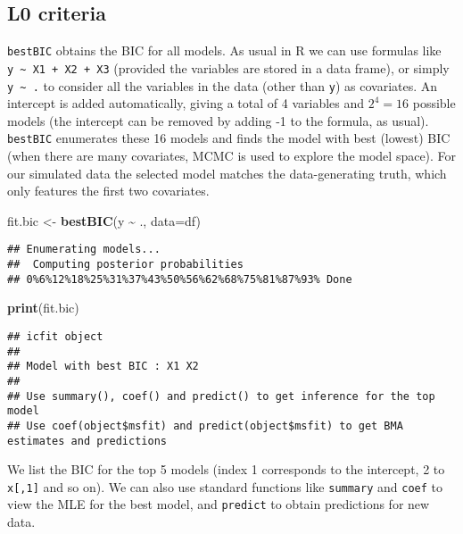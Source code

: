 \documentclass[
]{book}
\newenvironment{Shaded}{\begin{snugshade}}{\end{snugshade}}
\newcommand{\AttributeTok}[1]{\textcolor[rgb]{0.13,0.29,0.53}{#1}}
\newcommand{\FunctionTok}[1]{\textcolor[rgb]{0.13,0.29,0.53}{\textbf{#1}}}
\newcommand{\NormalTok}[1]{#1}
\newcommand{\OtherTok}[1]{\textcolor[rgb]{0.56,0.35,0.01}{#1}}
\newcommand{\SpecialCharTok}[1]{\textcolor[rgb]{0.81,0.36,0.00}{\textbf{#1}}}
\theoremstyle{definition}
\theoremstyle{definition}
\theoremstyle{definition}
\theoremstyle{definition}
\theoremstyle{remark}
\begin{document}
\subsection{L0 criteria}\label{l0-criteria}

\texttt{bestBIC} obtains the BIC for all models.
As usual in R we can use formulas like \texttt{y\ \textasciitilde{}\ X1\ +\ X2\ +\ X3} (provided the variables are stored in a data frame), or simply \texttt{y\ \textasciitilde{}\ .} to consider all the variables in the data (other than \texttt{y}) as covariates.
An intercept is added automatically, giving a total of 4 variables and \(2^4=16\) possible models (the intercept can be removed by adding -1 to the formula, as usual). \texttt{bestBIC} enumerates these 16 models and finds the model with best (lowest) BIC (when there are many covariates, MCMC is used to explore the model space).
For our simulated data the selected model matches the data-generating truth, which only features the first two covariates.

\begin{Shaded}
\begin{Highlighting}[]
\NormalTok{fit.bic }\OtherTok{\textless{}{-}} \FunctionTok{bestBIC}\NormalTok{(y }\SpecialCharTok{\textasciitilde{}}\NormalTok{ ., }\AttributeTok{data=}\NormalTok{df)}
\end{Highlighting}
\end{Shaded}

\begin{verbatim}
## Enumerating models...
##  Computing posterior probabilities
## 0%6%12%18%25%31%37%43%50%56%62%68%75%81%87%93% Done
\end{verbatim}

\begin{Shaded}
\begin{Highlighting}[]
\FunctionTok{print}\NormalTok{(fit.bic)}
\end{Highlighting}
\end{Shaded}

\begin{verbatim}
## icfit object
## 
## Model with best BIC : X1 X2 
## 
## Use summary(), coef() and predict() to get inference for the top model
## Use coef(object$msfit) and predict(object$msfit) to get BMA estimates and predictions
\end{verbatim}

We list the BIC for the top 5 models (index 1 corresponds to the intercept, 2 to \texttt{x{[},1{]}} and so on). We can also use standard functions like \texttt{summary} and \texttt{coef} to view the MLE for the best model, and \texttt{predict} to obtain predictions for new data.
\end{document}
